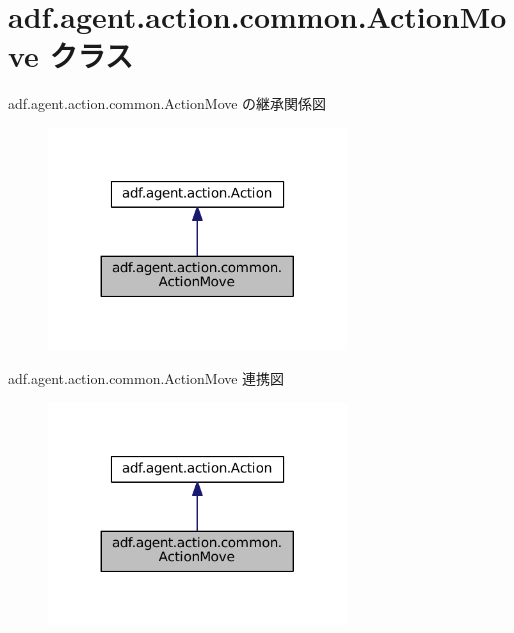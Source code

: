 \hypertarget{classadf_1_1agent_1_1action_1_1common_1_1ActionMove}{}\section{adf.\+agent.\+action.\+common.\+Action\+Move クラス}
\label{classadf_1_1agent_1_1action_1_1common_1_1ActionMove}


adf.\+agent.\+action.\+common.\+Action\+Move の継承関係図
\nopagebreak
\begin{figure}[H]
\begin{center}
\leavevmode
\includegraphics[width=224pt]{classadf_1_1agent_1_1action_1_1common_1_1ActionMove__inherit__graph}
\end{center}
\end{figure}


adf.\+agent.\+action.\+common.\+Action\+Move 連携図
\nopagebreak
\begin{figure}[H]
\begin{center}
\leavevmode
\includegraphics[width=224pt]{classadf_1_1agent_1_1action_1_1common_1_1ActionMove__coll__graph}
\end{center}
\end{figure}

